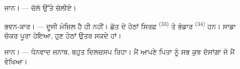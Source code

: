 \textsc{ਜਾਨ}। --- ਚੱਲੋ  ਉੱਤੇ ਚੱਲੀਏ।

\textsc{ਭਵਨ-ਕਾਰ}। --- ਦੂਜੀ ਮੰਜ਼ਿਲ ਹੈ ਹੀ ਨਹੀਂ। ਛੱਤ ਦੇ ਹੇਠਾਂ ਸਿਰਫ਼
 \textsuperscript{(33)} ਤੇ ਭੰਡਾਰ \textsuperscript{(34)} ਹਨ। ਸਾਡਾ
ਚੱਕਰ ਪੂਰਾ ਹੋਇਆ, ਹੁਣ ਹੇਠਾਂ ਉਤਰ ਸਕਦੇ ਹਾਂ।

\textsc{ਜਾਨ}। --- ਧੰਨਵਾਦ ਜਨਾਬ, ਬਹੁਤ ਦਿਲਚਸਪ ਰਿਹਾ। ਮੈਂ ਆਪਣੇ ਪਿਤਾ ਨੂੰ ਸਭ ਕੁਝ
ਦੱਸਾਂਗਾ ਜੋ ਮੈਂ ਵੇਖਿਆ।
\VUsaut{4.0mm}
\VUfilet{22mm}
